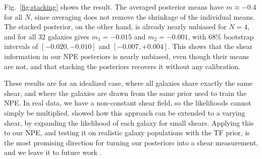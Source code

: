 Fig.~\ref{fig:stacking} shows the result. The averaged posterior means have $m \approx -0.4$ for all $N$, since averaging does not remove the shrinkage of the individual means. The stacked posterior, on the other hand, is already nearly unbiased for $N = 4$, and for all 32 galaxies gives $m_1 = -0.015$ and $m_2 = -0.001$, with 68\% bootstrap intervals of $[-0.020, -0.010]$ and $[-0.007, +0.004]$. This shows that the shear information in our NPE posteriors is nearly unbiased, even though their means are not, and that stacking the posteriors recovers it without any calibration.

These results are for an idealized case, where all galaxies share exactly the same shear, and where the galaxies are drawn from the same prior used to train the NPE. In real data, we have a non-constant shear field, so the likelihoods cannot simply be multiplied. \citep{BA14} showed how this approach can be extended to a varying shear, by expanding the likelihood of each galaxy for small shears. Applying this to our NPE, and testing it on realistic galaxy populations with the TF prior, is the most promising direction for turning our posteriors into a shear measurement, and we leave it to future work .
